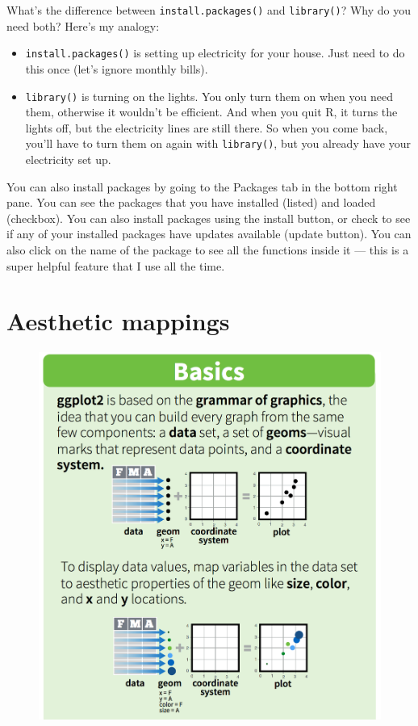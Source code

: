 \documentclass[]{book}
\providecommand{\tightlist}{%
  \setlength{\itemsep}{0pt}\setlength{\parskip}{0pt}}
\theoremstyle{definition}
\theoremstyle{definition}
\theoremstyle{definition}
\theoremstyle{remark}
\begin{document}
What's the difference between \texttt{install.packages()} and
\texttt{library()}? Why do you need both? Here's my analogy:

\begin{itemize}
\tightlist
\item
  \texttt{install.packages()} is setting up electricity for your house.
  Just need to do this once (let's ignore monthly bills).
\item
  \texttt{library()} is turning on the lights. You only turn them on
  when you need them, otherwise it wouldn't be efficient. And when you
  quit R, it turns the lights off, but the electricity lines are still
  there. So when you come back, you'll have to turn them on again with
  \texttt{library()}, but you already have your electricity set up.
\end{itemize}

You can also install packages by going to the Packages tab in the bottom
right pane. You can see the packages that you have installed (listed)
and loaded (checkbox). You can also install packages using the install
button, or check to see if any of your installed packages have updates
available (update button). You can also click on the name of the package
to see all the functions inside it --- this is a super helpful feature
that I use all the time.

\section{Aesthetic mappings}\label{aesthetic-mappings}

\begin{figure}
\centering
\includegraphics{img/rstudio-cheatsheet-ggplot.png}
\caption{}
\end{figure}
\end{document}
